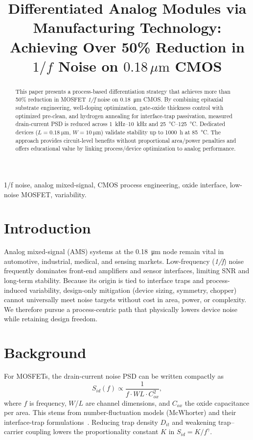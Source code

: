 \documentclass[conference]{IEEEtran}
\title{Differentiated Analog Modules via Manufacturing Technology:\\
Achieving Over 50\% Reduction in $1/f$ Noise on
\texorpdfstring{\mbox{$0.18\,\mu\mathrm{m}$}}{0.18 µm} CMOS}
\author{
\IEEEauthorblockN{Shinichi Samizo}
\IEEEauthorblockA{Independent Semiconductor Researcher\\
Project Design Hub, Samizo--AITL\\
\textit{Email:} \href{mailto:shin3t72@gmail.com}{shin3t72@gmail.com}\quad
\textit{GitHub:} \href{https://github.com/Samizo-AITL}{Samizo-AITL}}
}
\begin{document}
\maketitle

\begin{abstract}
This paper presents a process-based differentiation strategy that achieves more than 50\% reduction in MOSFET \emph{1/f} noise on \SI{0.18}{\micro\meter} CMOS. By combining epitaxial substrate engineering, well-doping optimization, gate-oxide thickness control with optimized pre-clean, and hydrogen annealing for interface-trap passivation, measured drain-current PSD is reduced across \SIrange{1}{10}{\kilo\hertz} and \SIrange{25}{125}{\celsius}. Dedicated devices ($L=\SI{0.18}{\micro\meter}$, $W=\SI{10}{\micro\meter}$) validate stability up to 1000~h at \SI{85}{\celsius}. The approach provides circuit-level benefits without proportional area/power penalties and offers educational value by linking process/device optimization to analog performance.
\end{abstract}

\begin{IEEEkeywords}
1/f noise, analog mixed-signal, CMOS process engineering, oxide interface, low-noise MOSFET, variability.
\end{IEEEkeywords}

\section{Introduction}
Analog mixed-signal (AMS) systems at the \SI{0.18}{\micro\meter} node remain vital in automotive, industrial, medical, and sensing markets. Low-frequency (\emph{1/f}) noise frequently dominates front-end amplifiers and sensor interfaces, limiting SNR and long-term stability. Because its origin is tied to interface traps and process-induced variability, design-only mitigation (device sizing, symmetry, chopper) cannot universally meet noise targets without cost in area, power, or complexity. We therefore pursue a process-centric path that physically lowers device noise while retaining design freedom.

\section{Background}
For MOSFETs, the drain-current noise PSD can be written compactly as
\begin{equation}
  S_{id}(f) \propto \frac{1}{f \cdot W L \cdot C_{ox}^{2}},
\end{equation}
where $f$ is frequency, $W$/$L$ are channel dimensions, and $C_{ox}$ the oxide capacitance per area. This stems from number-fluctuation models (McWhorter) and their interface-trap formulations~\cite{Takeda,Ghibaudo}. Reducing trap density $D_{it}$ and weakening trap--carrier coupling lowers the proportionality constant $K$ in $S_{id}=K/f^{\gamma}$.
\end{document}
